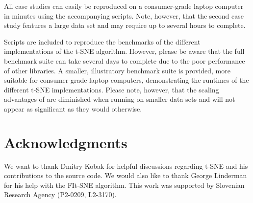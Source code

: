 \documentclass[article]{jss}
\newcommand{\opentsne}{\pkg{openTSNE}\xspace}
\begin{document}
All case studies can easily be reproduced on a consumer-grade laptop computer in minutes using the accompanying scripts. Note, however, that the second case study features a large data set and may require up to several hours to complete.

Scripts are included to reproduce the benchmarks of the different implementations of the t-SNE algorithm. However, please be aware that the full benchmark suite can take several days to complete due to the poor performance of other libraries. A smaller, illustratory benchmark suite is provided, more suitable for consumer-grade laptop computers, demonstrating the runtimes of the different t-SNE implementations. Please note, however, that the scaling advantages of \opentsne are diminished when running on smaller data sets and will not appear as significant as they would otherwise.


\section*{Acknowledgments}

We want to thank Dmitry Kobak for helpful discussions regarding t-SNE and his
contributions to the source code. We would also like to thank George Linderman
for his help with the FIt-SNE algorithm. This work was supported by Slovenian
Research Agency (P2-0209, L2-3170).




\end{document}
